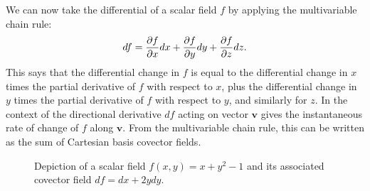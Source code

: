 We can now take the differential of a scalar field $f$ by applying the multivariable chain rule:
\begin{align}
  df = \frac{ \partial {f} }{ \partial {x} } dx + \frac{ \partial {f} }{ \partial {y} } dy + \frac{ \partial {f} }{ \partial {z} } dz .
\end{align}
This says that the differential change in $f$ is equal to the differential change in $x$ times the partial derivative of $f$ with respect to $x$, plus the differential change in $y$ times the partial derivative of $f$ with respect to $y$, and similarly for $z$. In the context of the directional derivative $df$ acting on vector $\mathbf{v}$ gives the instantaneous rate of change of $f$ along $\mathbf{v}$. From the multivariable chain rule, this can be written as the sum of Cartesian basis covector fields.

\begin{figure}[!tb]
\begin{center}
\begin{subfigure}[b]{0.3\textwidth}
\end{subfigure}
\hspace{2cm}
\begin{subfigure}[b]{0.3\textwidth}

\end{subfigure}

\caption{Depiction of a scalar field $f(x,y) = x + y^2 - 1$ and its associated covector field $df = dx + 2y dy$.}
\label{Fig:vector_covectorFieldExample}
\end{center}
\end{figure}


